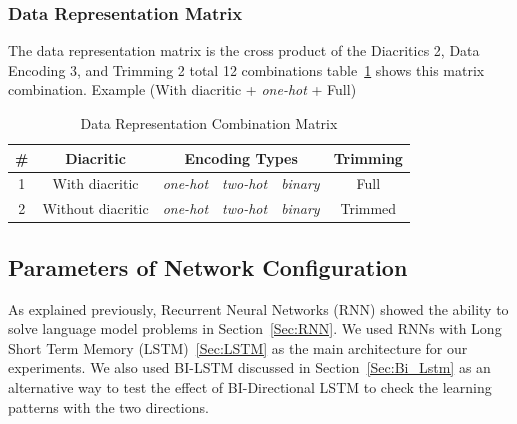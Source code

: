\subsubsection{Data Representation Matrix}

The data representation matrix is the cross product of the Diacritics 2, Data Encoding 3, and Trimming 2 total 12 combinations table~\ref{Tab:Data_Representation_Matrix} shows this matrix combination. Example (With diacritic + \textit{one-hot} + Full)


\begin{table}[t]
  \centering
  \begin{tabular}{c c c c c c}
    \hline
    \textbf{\#} & \textbf{Diacritic} & \multicolumn{3}{c}{\textbf{Encoding Types}}  & \textbf{Trimming} \\
    
    \hline
    1 & With diacritic & \textit{one-hot} & \textit{two-hot} & \textit{binary} & Full    \\
    \hline
    2 & Without diacritic & \textit{one-hot} & \textit{two-hot} & \textit{binary} & Trimmed \\
    \hline
  \end{tabular}
  \caption{Data Representation Combination Matrix}\label{Tab:Data_Representation_Matrix}
\end{table}


%     
\subsection{Parameters of Network Configuration}\label{Sec:Rnn_Param}

As explained previously, Recurrent Neural Networks (RNN) showed the ability to solve language model problems in Section~\ref{Sec:RNN}. We used RNNs with Long Short Term Memory (LSTM)~\ref{Sec:LSTM} as the main architecture for our experiments. We also used BI-LSTM discussed in Section~\ref{Sec:Bi_Lstm} as an alternative way to test the effect of BI-Directional LSTM to check the learning patterns with the two directions.


